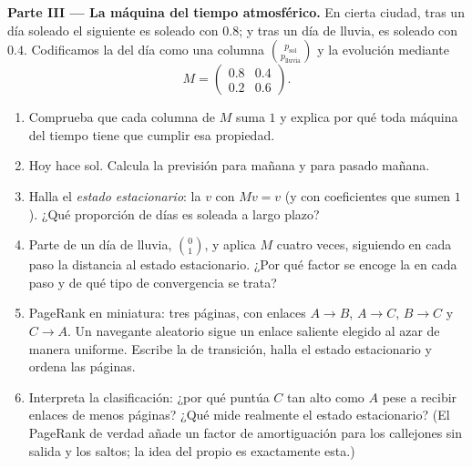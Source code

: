 \begin{problem}
\medskip
\noindent\textbf{Parte III --- La máquina del tiempo atmosférico.}
En cierta ciudad, tras un día soleado el siguiente es soleado con
 $0.8$; y tras un día de lluvia, es soleado con 
$0.4$. Codificamos la  del día como una columna
$\binom{p_{\text{sol}}}{p_{\text{lluvia}}}$ y la evolución mediante
\[
M = \begin{pmatrix} 0.8 & 0.4\\ 0.2 & 0.6 \end{pmatrix}.
\]
\begin{enumerate}[resume]
  \item Comprueba que cada columna de $M$ suma $1$ y explica por qué toda
        máquina del tiempo tiene que cumplir esa propiedad.
  \item Hoy hace sol. Calcula la previsión para mañana y para pasado
        mañana.
  \item Halla el \emph{estado estacionario}: la  $v$ con
        $Mv = v$ (y con coeficientes que sumen $1$). ¿Qué proporción de
        días es soleada a largo plazo?
  \item Parte de un día de lluvia, $\binom01$, y aplica $M$ cuatro veces,
        siguiendo en cada paso la distancia al estado estacionario. ¿Por
        qué factor se encoge la  en cada paso y de qué tipo de
        convergencia se trata?
  \item PageRank en miniatura: tres páginas, con enlaces $A \to B$,
        $A \to C$, $B \to C$ y $C \to A$. Un navegante aleatorio sigue un
        enlace saliente elegido al azar de manera uniforme. Escribe la
         de transición, halla el estado estacionario y ordena las
        páginas.
  \item Interpreta la clasificación: ¿por qué puntúa $C$ tan alto como $A$
        pese a recibir enlaces de menos páginas? ¿Qué mide realmente el
        estado estacionario? (El PageRank de verdad añade un factor de
        amortiguación para los callejones sin salida y los saltos; la idea
        del  propio es exactamente esta.)
\end{enumerate}


\end{problem}
